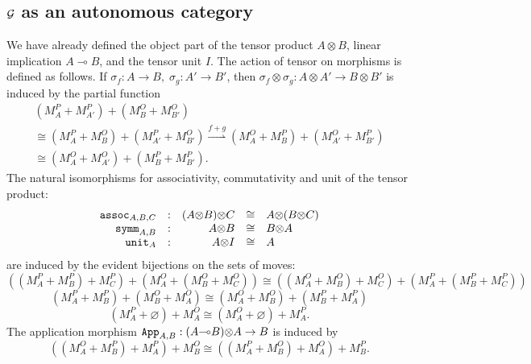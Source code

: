 \documentclass[11pt]{article}
\newcommand{\Pfr}{\rightharpoonup}
\newcommand{\tensor}{\mbox{$\otimes$}}
\newcommand{\linimpl}{\mbox{$\multimap$}}
\newcommand{\Games}{\mbox{$\cal{G}$}}
\begin{document}
\subsection{$\Games$ as an autonomous category}
We have already defined the object part of the tensor product $A
\tensor B$, linear implication $A \linimpl B$, and the tensor unit $I$.
The action of tensor on morphisms is defined as follows.  If $\sigma_f: A
\rightarrow B, \; \sigma_g: A' \rightarrow B'$, then
$\sigma_f \tensor \sigma_g: A\tensor A' \rightarrow B \tensor B'$  is
induced by the partial function
\[ \begin{array}{l}
(M_A^{P} + M_{A'}^{P}) + (M_B^{O} + M_{B'}^{O}) \\
\cong (M_A^{P} + M_{B}^{O}) + (
M_{A'}^{P}+ M_{B'}^{O})
\stackrel{f+g}{\Pfr} (M_A^{O} + M_{B}^{P})+ ( M_{A'}^{O}+ M_{B'}^{P}) \\
\cong (M_A^{O} + M_{A'}^{O}) + (M_B^{P} + M_{B'}^{P}) .
\end{array} \]
The natural isomorphisms for associativity, commutativity and unit of the
tensor product:
\[ \begin{array}{rcrcl}
{\tt assoc}_{A,B,C} & : & (A \tensor B) \tensor C & \cong & A \tensor (B \tensor C) \\
{\tt symm}_{A,B} & : & A \tensor B & \cong & B \tensor A \\
{\tt unit}_{A} & : & A \tensor I & \cong & A
\end{array} \]
are induced by the evident bijections on the sets of moves:
\[ ((M^{P}_A + M^{P}_B) + M^{P}_C) + (M^{O}_A + (M^{O}_B + M^{O}_C))  \cong
((M^{O}_A
+ M^{O}_B) + M^{O}_C) + (M^{P}_A + (M^{P}_B + M^{P}_C)) \]
\[ (M^{P}_{A} + M_{B}^{P}) + (M^{O}_{B} + M^{O}_{A})  \cong
(M_{A}^{O} + M^{O}_{B}) + (M_{B}^{P} + M^{P}_{A}) \]
\[ (M_{A}^{P} + \varnothing ) + M^{O}_{A}  \cong (M^{O}_{A} + \varnothing ) +
M_{A}^{P} .
\]
The application morphism ${\tt App}_{A,B}: (A \linimpl B) \tensor A
\rightarrow B$ is induced by
\[ ((M^{O}_A + M^{P}_B) + M^{P}_A) + M^{O}_B \cong ((M^{P}_A + M^{O}_B) + M^{O}_A) + M^{P}_B .
\]
\end{document}
